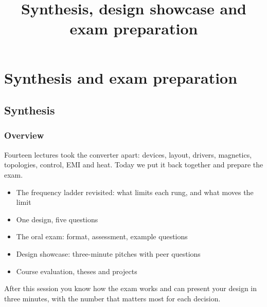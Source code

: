 \title[Synthesis and exam preparation]{Synthesis, design showcase and exam preparation}
\section{Synthesis and exam preparation}

\begin{frame}[plain]
	\titlepage
\end{frame}

\subsection{Synthesis}

\begin{frame}
	\frametitle{Overview}
	Fourteen lectures took the converter apart: devices, layout, drivers, magnetics, topologies, control, EMI and heat. Today we put it back together and prepare the exam.
	\begin{itemize}
		\item The frequency ladder revisited: what limits each rung, and what moves the limit
		\item One design, five questions
		\item The oral exam: format, assessment, example questions
		\item Design showcase: three-minute pitches with peer questions
		\item Course evaluation, theses and projects
	\end{itemize}
	After this session you know how the exam works and can present your design in three minutes, with the number that matters most for each decision.
\end{frame}

